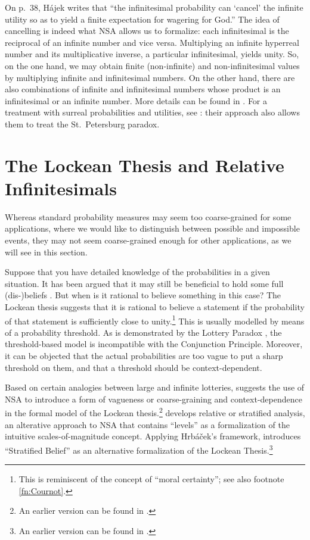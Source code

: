 On p.~38, H\'{a}jek writes that ``the infinitesimal probability can `cancel' the infinite utility so as to yield a finite expectation for wagering for God.''
The idea of cancelling is indeed what NSA allows us to formalize: each infinitesimal is the reciprocal of an infinite number and vice versa. Multiplying an infinite hyperreal number and its multiplicative inverse, a particular infinitesimal, yields unity. So, on the one hand, we may obtain finite (non-infinite) and non-infinitesimal values by multiplying infinite and infinitesimal numbers. On the other hand, there are also combinations of infinite and infinitesimal numbers whose product is an infinitesimal or an infinite number. More details can be found in \citet{Wenmackers:forthc}. For a treatment with surreal probabilities and utilities, see \citet{ChenRubio:forthc}: their approach also allows them to treat the St.~Petersburg paradox.

\section{The Lockean Thesis and Relative Infinitesimals}\label{sec:LT}
Whereas standard probability measures may seem too coarse-grained for some applications, where we would like to distinguish between possible and impossible events, they may not seem coarse-grained enough for other applications, as we will see in this section.

Suppose that you have detailed knowledge of the probabilities in a given situation. It has been argued that it may still be beneficial to hold some full (dis-)beliefs \citep{Foley:2009}. But when is it rational to believe something in this case? The Lockean thesis suggests that it is rational to believe a statement if the probability of that statement is sufficiently close to unity.\footnote{This is reminiscent of the concept of ``moral certainty''; see also footnote \ref{fn:Cournot}.} This is usually modelled by means of a probability threshold. As is demonstrated by the Lottery Paradox \citep{Kyburg:1961}, the threshold-based model is incompatible with the Conjunction Principle. Moreover, it can be objected that the actual probabilities are too vague to put a sharp threshold on them, and that a threshold should be context-dependent.

Based on certain analogies between large and infinite lotteries, \citet{Wenmackers:2012f} suggests the use of NSA to introduce a form of vagueness or coarse-graining and context-dependence in the formal model of the Lockean thesis.\footnote{An earlier version can be found in \citet[Ch.~4]{Wenmackers:2011a}.} \citet{Hrbacek:2007} develops relative or stratified analysis, an alterative approach to NSA that contains ``levels'' as a formalization of the intuitive scales-of-magnitude concept. Applying Hrb\'{a}\v{c}ek's framework, \citet{Wenmackers:2013} introduces ``Stratified Belief'' as an alternative formalization of the Lockean Thesis.\footnote{An earlier version can be found in \citet[Ch.~3]{Wenmackers:2011a}.}

